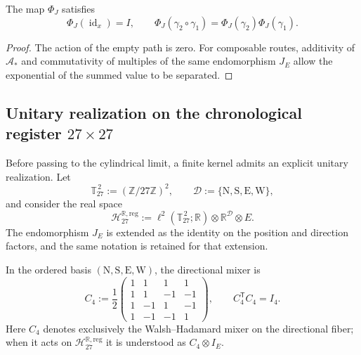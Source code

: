 \begin{proposition}
\label{x_reciprocidad:prop:fase-interna-functor-rev2}
The map \(\Phi_J\) satisfies
\[
 \Phi_J(\operatorname{id}_x)=I,
 \qquad
 \Phi_J(\gamma_2\circ\gamma_1)
 =\Phi_J(\gamma_2)\Phi_J(\gamma_1).
\]
\end{proposition}

\begin{proof}
The action of the empty path is zero. For composable routes, additivity of
\(\mathcal A_*\) and commutativity of multiples of the same endomorphism
\(J_E\) allow the exponential of the summed value to be separated.
\end{proof}

\subsection{Unitary realization on the chronological register
\texorpdfstring{\(27\times27\)}{27 x 27}}
\label{x_reciprocidad:sec:realizacion-unitaria-registro-27-rev3}

Before passing to the cylindrical limit, a finite kernel admits an explicit
unitary realization. Let
\[
 \mathbb T_{27}^{\,2}:=(\mathbb Z/27\mathbb Z)^2,
 \qquad
 \mathcal D:=\{\mathrm N,\mathrm S,\mathrm E,\mathrm W\},
\]
and consider the real space
\[
 \mathcal H_{27}^{\mathbb R,\mathrm{reg}}
 :=\ell^2(\mathbb T_{27}^{\,2};\mathbb R)
   \otimes\mathbb R^{\mathcal D}\otimes E.
\]
The endomorphism \(J_E\) is extended as the identity on the position and
direction factors, and the same notation is retained for that extension.

In the ordered basis
\((\mathrm N,\mathrm S,\mathrm E,\mathrm W)\), the directional mixer is
\begin{equation}
 C_4:=\frac12
 \begin{pmatrix}
  1&1&1&1\\
  1&1&-1&-1\\
  1&-1&1&-1\\
  1&-1&-1&1
 \end{pmatrix},
 \qquad C_4^{\mathsf T}C_4=I_4.
 \label{x_reciprocidad:eq:mezclador-walsh-registro-27-rev3}
\end{equation}
Here \(C_4\) denotes exclusively the Walsh--Hadamard mixer on the
directional fiber; when it acts on
\(\mathcal H_{27}^{\mathbb R,\mathrm{reg}}\) it is understood as
\(C_4\otimes I_E\).

